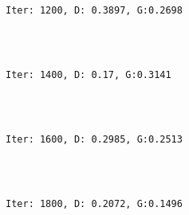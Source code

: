 \documentclass[11pt]{article}
\begin{document}
    \begin{center}
    \end{center}
    { \hspace*{\fill} \\}
    
    \begin{Verbatim}[commandchars=\\\{\}]

Iter: 1200, D: 0.3897, G:0.2698
    \end{Verbatim}

    \begin{center}
    \end{center}
    { \hspace*{\fill} \\}
    
    \begin{Verbatim}[commandchars=\\\{\}]

Iter: 1400, D: 0.17, G:0.3141
    \end{Verbatim}

    \begin{center}
    \end{center}
    { \hspace*{\fill} \\}
    
    \begin{Verbatim}[commandchars=\\\{\}]

Iter: 1600, D: 0.2985, G:0.2513
    \end{Verbatim}

    \begin{center}
    \end{center}
    { \hspace*{\fill} \\}
    
    \begin{Verbatim}[commandchars=\\\{\}]

Iter: 1800, D: 0.2072, G:0.1496
    \end{Verbatim}

    \begin{center}
    \end{center}
    { \hspace*{\fill} \\}
    
\end{document}
